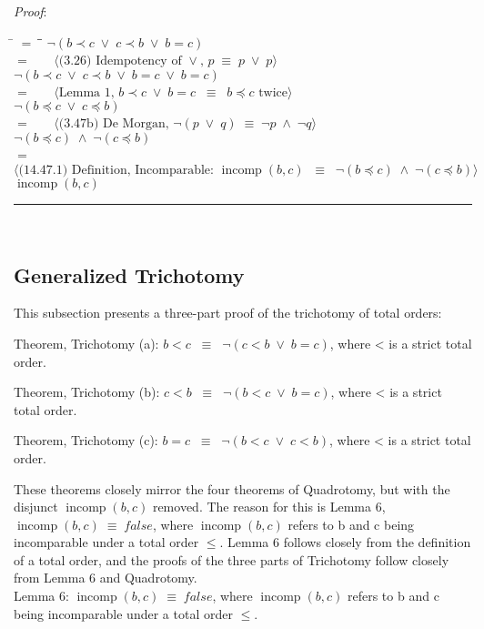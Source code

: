 \documentclass[12pt, fleqn, leqno]{article}
\newcommand{\lgap}{2pt}                             %
\newcommand{\mymathindent}{24pt}                    %
\newcommand{\equivs}{\ensuremath{\;\equiv\;}}       %
\newcommand{\equivss}{\ensuremath{\;\;\equiv\;\;}}  %
\newcommand{\lors}{\ensuremath{\;\lor\;}}           %
\newcommand{\lands}{\ensuremath{\;\land\;}}         %
\newcommand{\myqed}{\rule[-.23ex]{1.2ex}{2.0ex}}
\newcommand{\myqedtab}{\hspace{384pt}}              %
\newcommand{\Gll} {\langle}                         %
\newcommand{\Ggg} {\rangle}                         %
\newcommand{\Hint}[1]     {\ \ \ $\Gll              \mbox{#1} \Ggg$ }   %
\DeclareMathOperator{\incomp}{incomp}
\begin{document}
\textit{Proof}:
\begin{tabbing}
\hspace{\mymathindent} \= $= \;$ \= \myqedtab \= \kill
	\> \>  $\lnot(b \prec c \lors c \prec b \lors b = c)$\\
	\> $=$  \>  \Hint{(3.26) Idempotency of $\lor$, $p \equivs p \lors p$}\\[\lgap]
	\> \>   $\lnot(b \prec c \lors c \prec b \lors b = c \lors b = c)$\\
	\> $=$  \>  \Hint{Lemma 1, $b \prec c \lors b = c \equivss b \preceq c$ twice}\\[\lgap]
	\> \>   $\lnot (b \preceq c \lors c \preceq b)$\\
	\> $=$  \>  \Hint{(3.47b) De Morgan, $\lnot (p \lors q) \equivs \lnot p \lands \lnot q$}\\[\lgap]
	\> \>   $\lnot (b \preceq c) \lands \lnot (c \preceq b)$\\
	\> $=$  \>  \Hint{(14.47.1) Definition, Incomparable: $\incomp(b, c) \equivss \lnot(b \preceq c) \lands \lnot(c \preceq b)$}\\[\lgap]
	\> \>   $\incomp(b, c)$ \quad \myqed\\
\end{tabbing}

\subsection{Generalized Trichotomy} \label{Trichotomy}

This subsection presents a three-part proof of the trichotomy of total orders:

Theorem, Trichotomy (a): $b < c \equivss \lnot(c < b \lors b = c)$, where < is a strict total order.

Theorem, Trichotomy (b): $c < b \equivss \lnot(b < c \lors b = c)$, where < is a strict total order.

Theorem, Trichotomy (c): $b = c \equivss \lnot(b < c \lors c < b)$, where < is a strict total order.

These theorems closely mirror the four theorems of Quadrotomy, but with the disjunct $\incomp(b,c)$ removed.
The reason for this is Lemma 6, $\incomp(b,c) \equivs false$, where $\incomp(b,c)$ refers to b and c being incomparable under a total order $\le$.
Lemma 6 follows closely from the definition of a total order, and the proofs of the three parts of Trichotomy follow closely from Lemma 6 and Quadrotomy.\\

Lemma 6: $\incomp(b,c) \equivs false$, where $\incomp(b,c)$ refers to b and c being incomparable under a total order $\le$.
\end{document}
